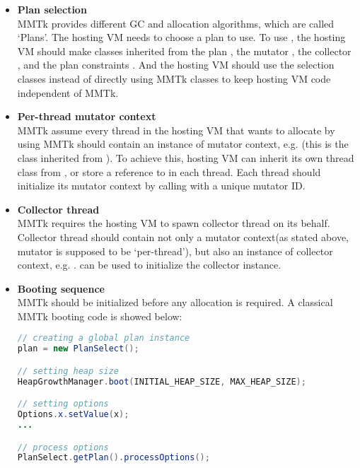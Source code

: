 \documentclass[12pt]{article}
\begin{document}
\begin{itemize}
\item
\textbf{Plan selection\\}
MMTk provides different GC and allocation algorithms, which
are called `Plans'. The hosting VM needs to choose
a plan to use. To use , 
the hosting VM should make  classes 
inherited from the plan , the mutator ,
the collector , and the plan
constraints . And the
hosting VM should use the selection classes instead of directly using
MMTk classes to keep hosting VM code independent of MMTk. 

\item
\textbf{Per-thread mutator context\\}
MMTk assume every thread in the hosting VM that wants to
allocate by using MMTk should contain an instance of 
mutator context, e.g. 
 (this is the  class
inherited from ). To
achieve this, hosting VM can inherit its own thread class
from , or store a reference to
 in each thread. Each thread
should initialize its mutator context by 
calling  with a unique 
mutator ID. 

\item
\textbf{Collector thread\\}
MMTk requires the hosting VM to spawn collector thread
on its behalf. Collector thread should contain not only
a mutator context(as stated above, mutator is supposed
to be `per-thread'), but also an instance of 
collector context, e.g. . 
can be used to initialize the collector instance. 

\item
\textbf{Booting sequence\\}
MMTk should be initialized before any allocation is required. 
A classical MMTk booting code is showed below:
\begin{lstlisting}[language=java]
// creating a global plan instance
plan = new PlanSelect();

// setting heap size
HeapGrowthManager.boot(INITIAL_HEAP_SIZE, MAX_HEAP_SIZE); 

// setting options
Options.x.setValue(x); 
...

// process options
PlanSelect.getPlan().processOptions();


\end{lstlisting}
\end{itemize}
\end{document}
